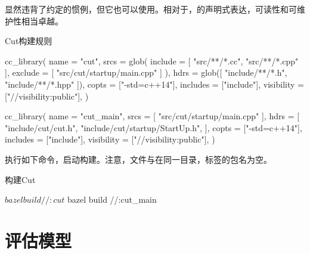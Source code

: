 \begin{content}
显然违背了约定的惯例，但它也可以使用。相对于，的声明式表达，可读性和可维护性相当卓越。

\begin{nodiff}{Cut构建规则}
 \begin{python}
cc_library(
  name = "cut",
  srcs = glob(
      include = [ 
          "src/**/*.cc",
          "src/**/*.cpp"
      ],  
      exclude = [ 
          "src/cut/startup/main.cpp"
      ]      
  ),  
  hdrs = glob([
      "include/**/*.h", "include/**/*.hpp"
  ]), 
  copts = ["-std=c++14"],
  includes = ["include"],
  visibility = ["//visibility:public"],
)

cc_library(
  name = "cut_main",
  srcs = [ 
      "src/cut/startup/main.cpp"
  ],  
  hdrs = [ 
      "include/cut/cut.h",
      "include/cut/startup/StartUp.h",
  ],                                                                                                                        
  copts = ["-std=c++14"],
  includes = ["include"],
  visibility = ["//visibility:public"],
)
 \end{python}
\end{nodiff}

执行如下命令，启动构建。注意，文件与在同一目录，标签的包名为空。

\begin{nodiff}{构建Cut}
 \begin{python}
$ bazel build //:cut
$ bazel build //:cut_main
 \end{python}
\end{nodiff}

\end{content}

\section{评估模型}


